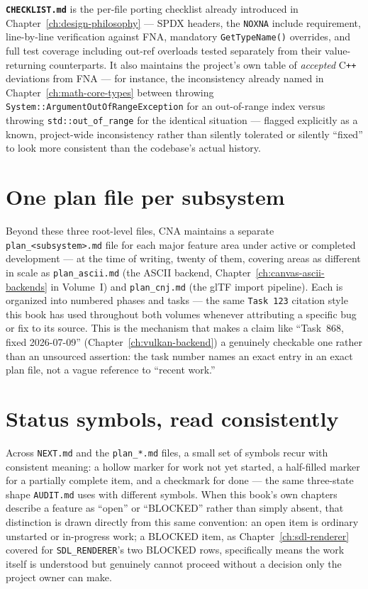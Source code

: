 \textbf{\texttt{CHECKLIST.md}} is the per-file porting checklist already introduced in
Chapter~\ref{ch:design-philosophy} --- SPDX headers, the \texttt{NOXNA} include requirement,
line-by-line verification against FNA, mandatory \texttt{GetTypeName()} overrides, and full
test coverage including out-ref overloads tested separately from their value-returning
counterparts. It also maintains the project's own table of \emph{accepted} C\texttt{++}
deviations from FNA --- for instance, the inconsistency already named in
Chapter~\ref{ch:math-core-types} between  throwing
\texttt{System::ArgumentOutOfRangeException} for an out-of-range index versus
 throwing \texttt{std::out\_of\_range} for the
identical situation --- flagged explicitly as a known, project-wide inconsistency rather than
silently tolerated or silently ``fixed'' to look more consistent than the codebase's actual
history.

\section{One plan file per subsystem}

Beyond these three root-level files, CNA maintains a separate \texttt{plan\_<subsystem>.md}
file for each major feature area under active or completed development --- at the time of
writing, twenty of them, covering areas as different in scale as \texttt{plan\_ascii.md} (the
ASCII backend, Chapter~\ref{ch:canvas-ascii-backends} in Volume~I) and \texttt{plan\_cnj.md}
(the glTF import pipeline). Each is organized into numbered phases and tasks --- the same
\texttt{Task~123} citation style this book has used throughout both volumes whenever
attributing a specific bug or fix to its source. This is the mechanism that makes a claim
like ``Task~868, fixed 2026-07-09'' (Chapter~\ref{ch:vulkan-backend}) a genuinely checkable
one rather than an unsourced assertion: the task number names an exact entry in an exact
plan file, not a vague reference to ``recent work.''

\section{Status symbols, read consistently}

Across \texttt{NEXT.md} and the \texttt{plan\_*.md} files, a small set of symbols recur with
consistent meaning: a hollow marker for work not yet started, a half-filled marker for a
partially complete item, and a checkmark for done --- the same three-state shape
\texttt{AUDIT.md} uses with different symbols. When this book's own chapters describe a
feature as ``open'' or ``BLOCKED'' rather than simply absent, that distinction is drawn
directly from this same convention: an open item is ordinary unstarted or in-progress work; a
BLOCKED item, as Chapter~\ref{ch:sdl-renderer} covered for \texttt{SDL\_RENDERER}'s two
BLOCKED rows, specifically means the work itself is understood but genuinely cannot proceed
without a decision only the project owner can make.

